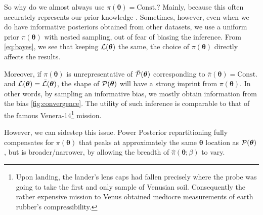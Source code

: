 \documentclass[usenatbib]{mnras}
\begin{document}
So why do we almost always use \(\pi (\bm{\theta}) = \text{Const.}\)?
Mainly, because this often accurately represents our prior knowledge
\citep{JeffreysPrior}. Sometimes, however, even when we do have
informative posteriors obtained from other datasets, we use a uniform
prior \(\pi (\bm{\theta})\) with nested sampling, out of fear of
biasing the inference. From \cref{eq:bayes}, we see that keeping
\( {\cal L} (\bm{\theta})\) the same, the choice of
\( \pi (\bm{\theta})\) directly affects the results. 

Moreover, if \( \pi (\bm{\theta})\) is unrepresentative of
\( \bar{\cal P}(\bm{\theta})\) corresponding to
\( \bar{\pi} (\bm{\theta}) = \text{Const.}\) and
\( {\cal L} (\bm{\theta}) = \bar{\cal L} (\bm{\theta})\), the shape of
\( {\cal P}(\bm{\theta})\) will have a strong imprint from
\( \pi (\bm{\theta})\). In other words, by sampling an informative
bias, we mostly obtain information from the bias
\cref{fig:convergence}.  The utility of such inference is comparable
to that of the famous Venera-14\footnote{Upon landing, the lander's
  lens caps had fallen precisely where the probe was going to take the
  first and only sample of Venusian soil. Consequently the rather
  expensive mission to Venus obtained mediocre measurements of earth
  rubber's compressibility.  } mission.

However, we can sidestep this issue. Power Posterior repartitioning
fully compensates for \( \pi (\bm{\theta})\) that peaks at
approximately the same $\bm{\theta}$ location as
\( {\cal P}(\bm{\theta})\), but is broader/narrower, by allowing the
breadth of \( \hat{\pi} (\bm{\theta};\beta)\) to vary.
\end{document}
